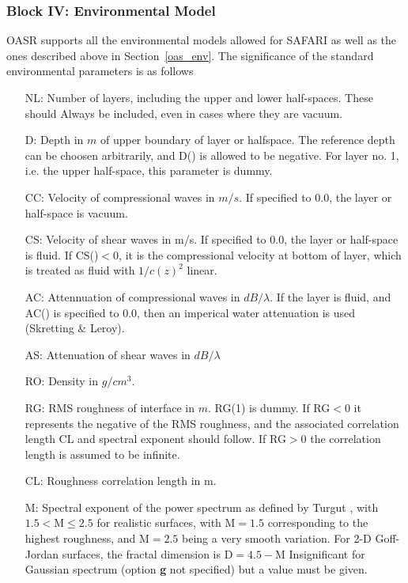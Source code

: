 \subsubsection{Block IV: Environmental Model}

OASR supports all the environmental models allowed for SAFARI as well as the
ones described above in Section~\ref{oas_env}.  The significance of
the standard environmental parameters is as follows
\begin{itemize}	
		\item[NL:]	Number of layers, including the upper and lower
		half-spaces. These should Always be included,
		even in cases where they are vacuum.

		\item[D:]	Depth in $m$ of upper boundary of layer or
		halfspace. The reference depth can be choosen
		arbitrarily, and D() is allowed to be negative.
		For layer no. 1, i.e. the upper half-space, this
     		parameter is dummy.

		\item[CC:]	Velocity of compressional waves in $m/s$.
        	If specified to 0.0, the layer or half-space is
		vacuum.

		\item[CS:]	Velocity of shear waves in m/s.
 		If specified to 0.0, the layer or half-space is fluid.
                If CS()$< 0$, it is the compressional velocity at bottom of
		layer, which is treated as fluid with $1/c(z)^{2}$ linear.

		\item[AC:]   Attennuation of compressional waves in 
		$dB/\lambda$. If the layer is fluid, and AC() is specified to
		0.0, then an imperical water attenuation is
		used (Skretting \& Leroy).

		\item[AS:]   Attenuation of shear waves in $dB/\lambda$

		\item[RO:]   Density in $g/cm^{3}$.

		\item[RG:]  RMS roughness of interface in $m$. RG(1) is dummy. 
                If RG$<0$ it represents the negative of the RMS roughness, and 
                the associated correlation length CL and spectral exponent 
                should follow. If RG$>0$ 
                the correlation length is assumed to be infinite.
		\item[CL:] Roughness correlation length in m. 

                \item[M:] Spectral exponent of the power spectrum as
                defined by Turgut \cite{Turgut_97}, with $1.5 <
                \mbox{M} \le 2.5 $ for realistic surfaces, with
                $\mbox{M} =1.5 $ corresponding to the highest
                roughness, and $\mbox{M}=2.5$ being a very smooth
                variation. For 2-D Goff-Jordan surfaces, the fractal
                dimension is $ \mbox{D} = 4.5 - \mbox{M} $
                Insignificant
                for Gaussian spectrum (option {\bf g} not specified)
                but a  value must
                be given.

		\end{itemize}
